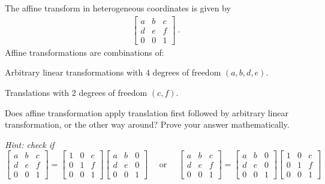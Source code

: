 \begin{problem}
  The affine transform in heterogeneous coordinates
  is given by
  \begin{align}
    \begin{bmatrix}
      a & b & c \\
      d & e & f \\
      0 & 0 & 1
    \end{bmatrix}~\label{eq:3.1}.
  \end{align}
  Affine transformations are combinations of:
  \begin{enumroman}
    \item Arbitrary linear transformations with $4$ degrees
      of freedom $(a, b, d, e)$.
    \item Translations with $2$ degrees of freedom $(c, f)$.
  \end{enumroman}
  
  \step
  Does affine transformation apply translation first followed by
  arbitrary linear transformation, or the other way around?
  Prove your answer mathematically.

  \step
  \emph{Hint: check if}\\
  $
    \begin{bmatrix}
      a & b & c \\
      d & e & f \\
      0 & 0 & 1
    \end{bmatrix}
    = 
    \begin{bmatrix}
      1 & 0 & c \\
      0 & 1 & f \\
      0 & 0 & 1
    \end{bmatrix}
    \begin{bmatrix}
      a & b & 0 \\
      d & e & 0 \\
      0 & 0 & 1
    \end{bmatrix}
    \quad \text{ or } \quad 
    \begin{bmatrix}
      a & b & c \\
      d & e & f \\
      0 & 0 & 1
    \end{bmatrix}
    =
    \begin{bmatrix}
      a & b & 0 \\
      d & e & 0 \\
      0 & 0 & 1
    \end{bmatrix}
    \begin{bmatrix}
      1 & 0 & c \\
      0 & 1 & f \\
      0 & 0 & 1
    \end{bmatrix}
  $
\end{problem}

